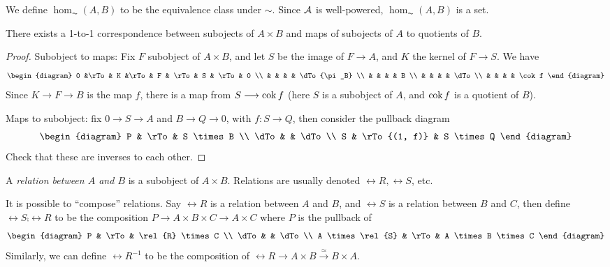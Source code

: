 We define $\hom_{\AC}(A, B)$ to be the equivalence class under 
$\sim$. Since $\mathcal{A}$ is well-powered, $\hom_{\AC}(A, B)$ is a
set.

\begin{lem}\label{lemma_2_2}
There exists a 1-to-1 correspondence between subojects of $A 
\times B$ and maps of subojects of $A$ to quotients of $B$.
\end{lem}
\begin{proof}
\noindent Subobject to maps: Fix $F$ subobject of $A \times B$, 
and let $S$ be the image of $F \to A$, and $K$ the kernel of $F 
\to S$. We have
\[
\begin{diagram}
0 &\rTo & K &\rTo & F           & \rTo & S & \rTo & 0 \\
  &     &   &     & \dTo{\pi_B} \\
  &     &   &     & B           \\
  &     &   &     & \dTo        \\
  &     &   &     & \cok f
\end{diagram}
\]
Since $K \to F \to B$ is the map $f$, there is a map from $S \longrightarrow 
\mathrm{cok}\, f$ (here $S$ is a subobject of $A$, and $\mathrm{cok}\, f$ is a 
quotient of $B$).

\noindent Maps to subobject: fix $0 \to S \to A$ and $B \to Q \to 
0$, with $f: S \to Q$, then consider the pullback diagram
\[
\begin{diagram}
P    & \rTo         & S \times B \\
\dTo &              & \dTo       \\
S    & \rTo{(1, f)} & S \times Q
\end{diagram}
\]
Check that these are inverses to each other.
\end{proof}

\begin{definition}
A \emph{relation between $A$ and $B$} is a subobject of $A \times 
B$. Relations are usually denoted $\rel{R}, \rel{S}$, etc.
\end{definition}

It is possible to ``compose'' relations. Say $\rel{R}$ is a 
relation between $A$ and $B$, and $\rel{S}$ is a relation
between $B$ and $C$, then define $\rel{S} \comp \rel{R}$ to be
the composition $P \to A \times B \times C \to A \times C$
where $P$ is the pullback of
\[
\begin{diagram}
P                & \rTo & \rel{R} \times C   \\
\dTo             &      & \dTo               \\
A \times \rel{S} & \rTo & A \times B \times C
\end{diagram}
\]
Similarly, we can define $\rel{R}^{-1}$ to be the composition of 
$\rel{R} \to A \times B \stackrel{\simeq}{\to} B \times A$.


